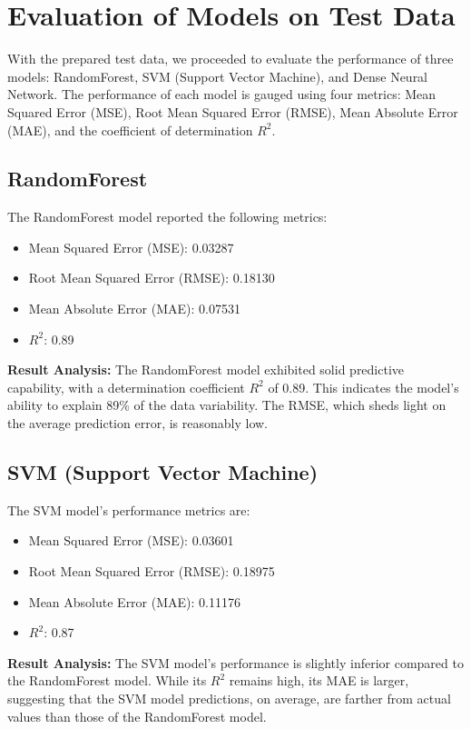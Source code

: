\documentclass[conference]{IEEEtran}
\begin{document}
\section{Evaluation of Models on Test Data}

With the prepared test data, we proceeded to evaluate the performance of three models: RandomForest, SVM (Support Vector Machine), and Dense Neural Network. The performance of each model is gauged using four metrics: Mean Squared Error (MSE), Root Mean Squared Error (RMSE), Mean Absolute Error (MAE), and the coefficient of determination \( R^2 \).

\subsection{RandomForest}

The RandomForest model reported the following metrics:

\begin{itemize}
    \item Mean Squared Error (MSE): 0.03287
    \item Root Mean Squared Error (RMSE): 0.18130
    \item Mean Absolute Error (MAE): 0.07531
    \item \( R^2 \): 0.89
\end{itemize}

\textbf{Result Analysis:}
The RandomForest model exhibited solid predictive capability, with a determination coefficient \( R^2 \) of 0.89. This indicates the model's ability to explain 89\% of the data variability. The RMSE, which sheds light on the average prediction error, is reasonably low.

\subsection{SVM (Support Vector Machine)}

The SVM model's performance metrics are:

\begin{itemize}
    \item Mean Squared Error (MSE): 0.03601
    \item Root Mean Squared Error (RMSE): 0.18975
    \item Mean Absolute Error (MAE): 0.11176
    \item \( R^2 \): 0.87
\end{itemize}

\textbf{Result Analysis:}
The SVM model's performance is slightly inferior compared to the RandomForest model. While its \( R^2 \) remains high, its MAE is larger, suggesting that the SVM model predictions, on average, are farther from actual values than those of the RandomForest model.
\end{document}
